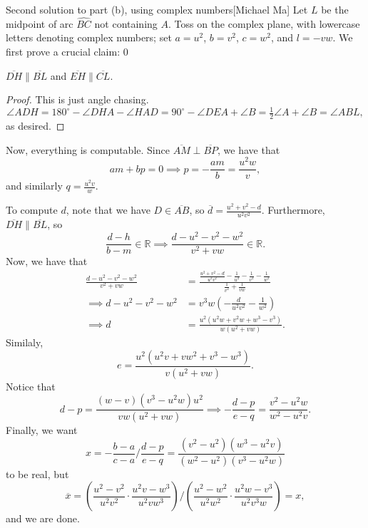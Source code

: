 \begin{customenv}{Second solution to part (b), using complex numbers}[Michael Ma]
    Let $L$ be the midpoint of arc $\widehat{BC}$ not containing $A$. Toss on the complex plane, with lowercase letters denoting complex numbers; set $a=u^2$, $b=v^2$, $c=w^2$, and $l=-vw$. We first prove a crucial claim:
    \setcounter{iclaim}0
    \begin{iclaim}
        $\overline{DH}\parallel\overline{BL}$ and $\overline{EH}\parallel\overline{CL}$.
    \end{iclaim}
    \begin{proof}
        This is just angle chasing. $$\angle ADH=180^\circ-\angle DHA-\angle HAD=90^\circ-\angle DEA+\angle B=\tfrac12\angle A+\angle B=\angle ABL,$$
        as desired.
    \end{proof}

    Now, everything is computable. Since $\overline{AM}\perp\overline{BP}$, we have that $$am+bp=0\implies p=-\frac{am}b=\frac{u^2w}v,$$
    and similarly $q=\tfrac{u^2v}w$.

    To compute $d$, note that we have $D\in\overline{AB}$, so $\overline d=\tfrac{u^2+v^2-d}{u^2v^2}$. Furthermore, $\overline{DH}\parallel\overline{BL}$, so $$\frac{d-h}{b-m}\in\mathbb R\implies\frac{d-u^2-v^2-w^2}{v^2+vw}\in\mathbb R.$$
    Now, we have that
    \begin{align*}
        \frac{d-u^2-v^2-w^2}{v^2+vw}&=\frac{\frac{u^2+v^2-d}{u^2v^2}-\frac1{u^2}-\frac1{v^2}-\frac1{w^2}}{\frac1{v^2}+\frac1{vw}}\\
        \implies d-u^2-v^2-w^2&=v^3w\left(-\frac d{u^2v^2}-\frac1{w^2}\right)\\
        \implies d&=\frac{u^2\left(u^2w+v^2w+w^3-v^3\right)}{w\left(u^2+vw\right)}.
    \end{align*}
    Similaly, $$e=\frac{u^2\left(u^2v+vw^2+v^3-w^3\right)}{v\left(u^2+vw\right)}.$$
    Notice that $$d-p=\frac{(w-v)\left(v^3-u^2w\right)u^2}{vw\left(u^2+vw\right)}\implies-\frac{d-p}{e-q}=\frac{v^2-u^2w}{w^2-u^2v}.$$
    Finally, we want $$x=-\frac{b-a}{c-a}\bigg/\frac{d-p}{e-q}=\frac{\left(v^2-u^2\right)\left(w^3-u^2v\right)}{\left(w^2-u^2\right)\left(v^3-u^2w\right)}$$
    to be real, but $$\overline x=\left(\frac{u^2-v^2}{u^2v^2}\cdot\frac{u^2v-w^3}{u^2vw^3}\right)\bigg/\left(\frac{u^2-w^2}{u^2w^2}\cdot\frac{u^2w-v^3}{u^2v^3w}\right)=x,$$
    and we are done. 
\end{customenv}
